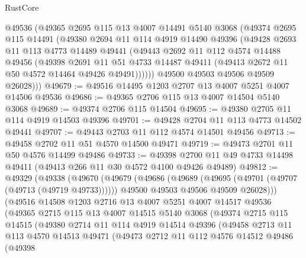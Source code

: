 \begin{lexlean}{RustCore}
\begin{coremodule}
        @49536
        (@49365
          @2695
          @115
          @13
          @4007
          @14491
          @5140
          @3068
          (@49374
            @2695
            @115
            @14491
            (@49380
              @2694
              @11
              @114
              @4919
              @14490
              @49396
              (@49428
                @2693
                @11
                @113
                @4773
                @14489
                @49441
                (@49443
                  @2692
                  @11
                  @112
                  @4574
                  @14488
                  @49456
                  (@49398
                    @2691
                    @11
                    @51
                    @4733
                    @14487
                    @49411
                    (@49413 @2672 @11 @50 @4572 @14464 @49426 @49491))))))
          @49500
          @49503
          @49506
          @49509
          @26028)))
@49679 := @49516 @14495 @1203 @2707 @13 @4007 @5251 @4007 @14506 @49536
@49686 := @49365 @2706 @115 @13 @4007 @14504 @5140 @3068
@49689 := @49374 @2706 @115 @14504
@49695 := @49380 @2705 @11 @114 @4919 @14503 @49396
@49701 := @49428 @2704 @11 @113 @4773 @14502 @49441
@49707 := @49443 @2703 @11 @112 @4574 @14501 @49456
@49713 := @49458 @2702 @11 @51 @4570 @14500 @49471
@49719 := @49473 @2701 @11 @50 @4576 @14499 @49486
@49733 := @49398 @2700 @11 @49 @4733 @14498 @49411 (@49413 @266 @11 @30 @4572 @4100 @49426 @49489)
@49812 := @49329
    (@49338
      (@49670
        (@49679
          (@49686
            (@49689 (@49695 (@49701 (@49707 (@49713 (@49719 @49733))))))
            @49500
            @49503
            @49506
            @49509
            @26028)))
      (@49516
        @14508
        @1203
        @2716
        @13
        @4007
        @5251
        @4007
        @14517
        @49536
        (@49365
          @2715
          @115
          @13
          @4007
          @14515
          @5140
          @3068
          (@49374
            @2715
            @115
            @14515
            (@49380
              @2714
              @11
              @114
              @4919
              @14514
              @49396
              (@49458
                @2713
                @11
                @113
                @4570
                @14513
                @49471
                (@49473
                  @2712
                  @11
                  @112
                  @4576
                  @14512
                  @49486
                  (@49398

\end{coremodule}
\end{lexlean}
